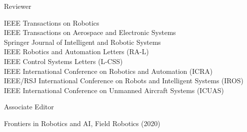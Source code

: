 

\begin{cvskills}

  \cvskill
    {Reviewer} %
    {\begin{minipage}[t]{\linewidth}\baselineskip
    		IEEE Transactions on Robotics \\
    		IEEE Transactions on Aerospace and Electronic Systems \\
    		Springer Journal of Intelligent and Robotic Systems \\
    		IEEE Robotics and Automation Letters (RA-L) \\
    		IEEE Control Systems Letters (L-CSS) \\
 		IEEE International Conference on Robotics and Automation (ICRA) \\
 		IEEE/RSJ International Conference on Robots and Intelligent Systems (IROS) \\
 		IEEE International Conference on Unmanned Aircraft Systems (ICUAS) \end{minipage}}
 \cvskill
    {Associate Editor} %
    {\begin{minipage}[t]{\linewidth}\baselineskip
    		Frontiers in Robotics and AI, Field Robotics (2020)\end{minipage}}

\end{cvskills}
